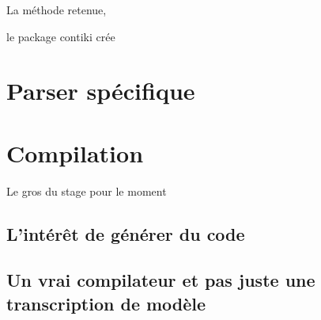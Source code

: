 La méthode retenue,

le package contiki crée


\section{Parser spécifique}

\section{Compilation}

Le gros du stage pour le moment

\subsection{L'intérêt de générer du code}

\subsection{Un vrai compilateur et pas juste une transcription de modèle}